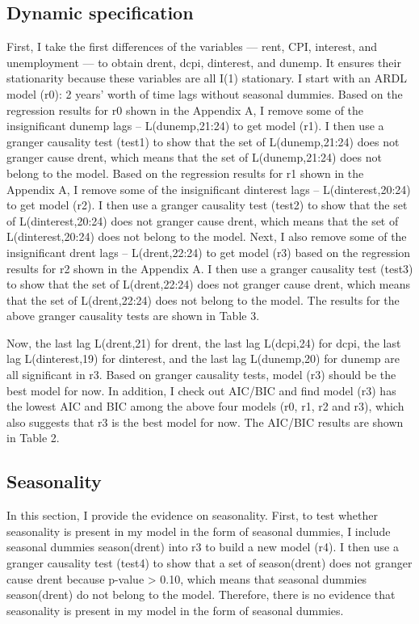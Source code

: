 \documentclass[12pt, times]{article}
\begin{document}
\subsection{Dynamic specification}
First, I take the first differences of the variables — rent, CPI, interest, and unemployment — to obtain drent, dcpi, dinterest, and dunemp. It ensures their stationarity because these variables are all I(1) stationary. I start with an ARDL model (r0): 2 years’ worth of time lags without seasonal dummies. Based on the regression results for r0 shown in the Appendix A, I remove some of the insignificant dunemp lags – L(dunemp,21:24) to get model (r1). I then use a granger causality test (test1) to show that the set of L(dunemp,21:24) does not granger cause drent, which means that the set of L(dunemp,21:24) does not belong to the model. Based on the regression results for r1 shown in the Appendix A, I remove some of the insignificant dinterest lags – L(dinterest,20:24) to get model (r2). I then use a granger causality test (test2) to show that the set of L(dinterest,20:24) does not granger cause drent, which means that the set of L(dinterest,20:24) does not belong to the model. Next, I also remove some of the insignificant drent lags – L(drent,22:24) to get model (r3) based on the regression results for r2 shown in the Appendix A. I then use a granger causality test (test3) to show that the set of L(drent,22:24) does not granger cause drent, which means that the set of L(drent,22:24) does not belong to the model. The results for the above granger causality tests are shown in Table 3. 

\hspace{1.5em}Now, the last lag L(drent,21) for drent, the last lag L(dcpi,24) for dcpi, the last lag L(dinterest,19) for dinterest, and the last lag L(dunemp,20) for dunemp are all significant in r3. Based on granger causality tests, model (r3) should be the best model for now. In addition, I check out AIC/BIC and find model (r3) has the lowest AIC and BIC among the above four models (r0, r1, r2 and r3), which also suggests that r3 is the best model for now. The AIC/BIC results are shown in Table 2.

\subsection{Seasonality}
In this section, I provide the evidence on seasonality. First, to test whether seasonality is present in my model in the form of seasonal dummies, I include seasonal dummies season(drent) into r3 to build a new model (r4). I then use a granger causality test (test4) to show that a set of season(drent) does not granger cause drent because p-value > 0.10, which means that seasonal dummies season(drent) do not belong to the model. Therefore, there is no evidence that seasonality is present in my model in the form of seasonal dummies. 
\end{document}
